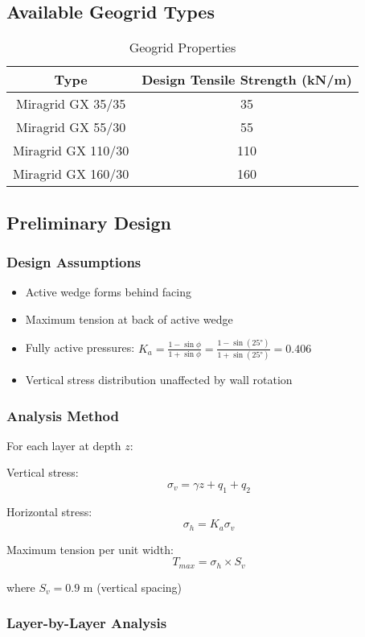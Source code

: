 \documentclass[10pt,a4paper,twocolumn]{article}
\begin{document}
\subsection{Available Geogrid Types}
\begin{table}[htbp]
\centering
\caption{Geogrid Properties}
\begin{tabular}{|c|c|}
\hline
\textbf{Type} & \textbf{Design Tensile Strength (kN/m)} \\
\hline
Miragrid GX 35/35 & 35 \\
Miragrid GX 55/30 & 55 \\
Miragrid GX 110/30 & 110 \\
Miragrid GX 160/30 & 160 \\
\hline
\end{tabular}
\end{table}

\subsection{Preliminary Design}

\subsubsection{Design Assumptions}
\begin{itemize}
\item Active wedge forms behind facing
\item Maximum tension at back of active wedge
\item Fully active pressures: $K_a = \frac{1-\sin\phi}{1+\sin\phi} = \frac{1-\sin(25°)}{1+\sin(25°)} = 0.406$
\item Vertical stress distribution unaffected by wall rotation
\end{itemize}

\subsubsection{Analysis Method}


For each layer at depth $z$:

Vertical stress:
$$\sigma_v = \gamma z + q_1 + q_2$$

Horizontal stress:
$$\sigma_h = K_a \sigma_v$$

Maximum tension per unit width:
$$T_{max} = \sigma_h \times S_v$$

where $S_v = 0.9$ m (vertical spacing)

\subsubsection{Layer-by-Layer Analysis}
\end{document}

